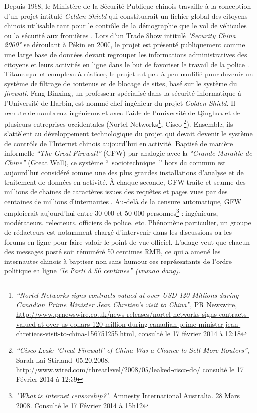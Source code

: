 Depuis 1998, le Ministère de la Sécurité Publique chinois travaille à la conception d’un projet intitulé \textit{Golden Shield} qui constituerait un fichier global des citoyens chinois utilisable tant pour le contrôle de la démographie que le vol de véhicules ou la sécurité aux frontières \citep{Lyons2009}. Lors d’un Trade Show intitulé \textit{"Security China 2000"} se déroulant à Pékin en 2000, le projet est présenté publiquement comme une large base de données devant regrouper les informations administratives des citoyens et leurs activités en ligne dans le but de favoriser le travail de la police \citep{Walton2001}. Titanesque et complexe à réaliser, le projet est peu à peu modifié pour devenir un système de filtrage de contenus et de blocage de sites, basé sur le système du \textit{firewall}. Fang Binxing, un professeur spécialisé dans la sécurité informatique à l’Université de Harbin, est nommé chef-ingénieur du projet \textit{Golden Shield}. Il recrute de nombreux ingénieurs et avec l’aide de l’université de Qinghua et de plusieurs entreprises occidentales (Nortel Networks\footnote{\textit{“Nortel Networks signs contracts valued at over USD 120 Millions during Canadian Prime Minister Jean Chretien’s visit to China”}, PR Newswire, \url{http://www.prnewswire.co.uk/news-releases/nortel-networks-signs-contracts-valued-at-over-us-dollars-120-million-during-canadian-prime-minister-jean-chretiens-visit-to-china-156751255.html}, consulté le 17 février 2014 à 12:18}, Cisco \footnote{\textit{“Cisco Leak: ‘Great Firewall’ of China Was a Chance to Sell More Routers”}, 
Sarah Lai Stirland, 05.20.2008, \url{http://www.wired.com/threatlevel/2008/05/leaked-cisco-do/} consulté le 17 Février 2014 à 12:39}). Ensemble, ils s’attèlent au développement technologique du projet qui devait devenir le système de contrôle de l’Internet chinois aujourd’hui en activité. Baptisé de manière informelle \textit{“The Great Firewall”} (GFW) par analogie avec la \textit{"Grande Muraille de Chine”} (Great Wall), ce système `` sociotechnique '' hors du commun est aujourd’hui considéré comme une des plus grandes installations d’analyse et de traitement de données en activité. À chaque seconde, GFW traite et scanne des millions de chaines de caractères issues des requêtes et pages vues par des centaines de millions d’internautes \citep{Winter2012}. Au-delà de la censure automatique, GFW emploierait aujourd’hui entre 30 000 et 50 000 personnes\footnote{\textit{"What is internet censorship?"}. Amnesty International Australia. 28 Mars 2008. Consulté le 17 Février 2014 à 15h12} : ingénieurs, modérateurs, relecteurs, officiers de police, etc. Phénomène particulier, un groupe de rédacteurs est notamment chargé d’intervenir dans les discussions ou les forums en ligne pour faire valoir le point de vue officiel. L’adage veut que chacun des messages posté soit rémunéré 50 centimes RMB, ce qui a amené les internautes chinois à baptiser non sans humour ces représentants de l’ordre politique en ligne \textit{“le Parti à 50 centimes” (wumao dang)}.

